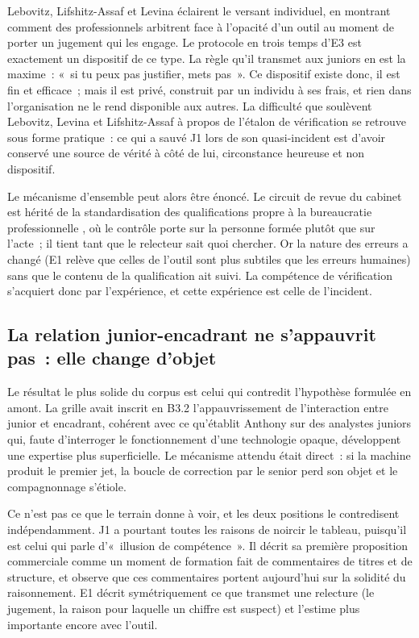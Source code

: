 Lebovitz, Lifshitz-Assaf et Levina \cite{lebovitz2022} éclairent le versant individuel, en
montrant comment des professionnels arbitrent face à l'opacité d'un outil au moment de porter
un jugement qui les engage. Le protocole en trois temps d'E3 est exactement un dispositif de
ce type. La règle qu'il transmet aux juniors en est la maxime~:
«~si tu peux pas justifier, mets pas~». Ce dispositif existe donc, il est fin et efficace~;
mais il est privé,
construit par un individu à ses frais, et rien dans l'organisation ne le rend disponible aux
autres. La difficulté que soulèvent Lebovitz, Levina et Lifshitz-Assaf \cite{lebovitz2021} à
propos de l'étalon de vérification se retrouve sous forme pratique~: ce qui a sauvé J1 lors de
son quasi-incident est d'avoir conservé une source de vérité à côté de lui, circonstance
heureuse et non dispositif.

Le mécanisme d'ensemble peut alors être énoncé. Le circuit de revue du cabinet est hérité de
la standardisation des qualifications propre à la bureaucratie professionnelle
\cite{mintzberg1982}, où le contrôle porte sur la personne formée plutôt que sur l'acte~; il
tient tant que le relecteur sait quoi chercher. Or la nature des erreurs a changé (E1
relève que celles de l'outil sont plus subtiles que les erreurs humaines) sans que le
contenu de la qualification ait suivi. La compétence de vérification s'acquiert donc par
l'expérience, et cette expérience est celle de l'incident.

\subsection{La relation junior-encadrant ne s'appauvrit pas~: elle change d'objet}

Le résultat le plus solide du corpus est celui qui contredit l'hypothèse formulée en amont. La
grille avait inscrit en B3.2 l'appauvrissement de l'interaction entre junior et encadrant,
cohérent avec ce qu'établit Anthony \cite{anthony2021} sur des analystes juniors qui, faute
d'interroger le fonctionnement d'une technologie opaque, développent une expertise plus
superficielle. Le mécanisme attendu était direct~: si la machine produit le premier jet, la
boucle de correction par le senior perd son objet et le compagnonnage s'étiole.

Ce n'est pas ce que le terrain donne à voir, et les deux positions le contredisent
indépendamment. J1 a pourtant toutes les raisons de noircir le tableau, puisqu'il est
celui qui parle d'«~illusion de compétence~». Il décrit sa première proposition commerciale
comme un moment de formation fait de commentaires de titres et de structure, et observe que
ces commentaires portent aujourd'hui sur la solidité du raisonnement. E1 décrit
symétriquement ce que transmet une relecture (le jugement, la raison pour laquelle un
chiffre est suspect) et l'estime plus importante encore avec l'outil.

